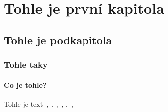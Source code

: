 \hypertarget{tohle-je-prvnuxed-kapitola}{%
\chapter{Tohle je první kapitola}\label{tohle-je-prvnuxed-kapitola}}

\hypertarget{tohle-je-podkapitola}{%
\section{Tohle je podkapitola}\label{tohle-je-podkapitola}}

\hypertarget{tohle-taky}{%
\subsection{Tohle taky}\label{tohle-taky}}

\hypertarget{co-je-tohle}{%
\subsubsection{Co je tohle?}\label{co-je-tohle}}

Tohle je text~\parencite[19]{dokulil67},~\parencite[19]{dokulil62},
\parencite[19]{cechova00},~\parencite[5]{sevcikova14},
\parencite[5]{sevcikova16},~\parencite[5]{simandl2016},
\parencite[]{derinet17}
